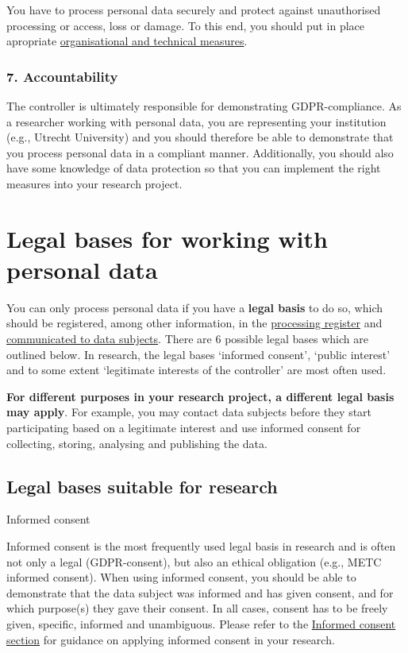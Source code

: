 \documentclass[
]{book}
\begin{document}
You have to process personal data securely and protect against unauthorised
processing or access, loss or damage. To this end, you should put in place
apropriate \protect\hyperlink{privacy-by-design}{organisational and technical measures}.

\hypertarget{accountability}{%
\subsubsection{7. Accountability}\label{accountability}}

The controller is ultimately responsible for demonstrating GDPR-compliance. As a
researcher working with personal data, you are representing your institution
(e.g., Utrecht University) and you should therefore be able to demonstrate that
you process personal data in a compliant manner. Additionally, you should also
have some knowledge of data protection so that you can implement the right
measures into your research project.

\hypertarget{legal-basis}{%
\section{Legal bases for working with personal data}\label{legal-basis}}

You can only process personal data if you have a \textbf{legal basis} to do so, which
should be registered, among other information, in the
\protect\hyperlink{processing-register}{processing register} and
\protect\hyperlink{privacy-notices}{communicated to data subjects}. There are 6 possible
legal bases which are outlined below. In research, the legal bases `informed
consent', `public interest' and to some extent `legitimate interests of the
controller' are most often used.

\textbf{For different purposes in your research project, a different
legal basis may apply}. For example, you may contact data subjects before they
start participating based on a legitimate interest and use informed consent for
collecting, storing, analysing and publishing the data.

\hypertarget{legal-bases-suitable-for-research}{%
\subsection{Legal bases suitable for research}\label{legal-bases-suitable-for-research}}

Informed consent

Informed consent is the most frequently used legal basis in research and
is often not only a legal (GDPR-consent), but also an ethical obligation
(e.g., METC informed consent). When using informed consent, you should
be able to demonstrate that the data subject was informed and has given
consent, and for which purpose(s) they gave their consent. In all cases,
consent has to be freely given, specific, informed and unambiguous. Please
refer to the \protect\hyperlink{informed-consent-forms}{Informed consent section} for
guidance on applying informed consent in your research.
\end{document}

